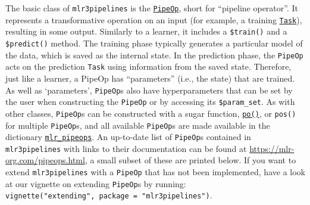 The basic class of \texttt{mlr3pipelines} is the
\href{https://mlr3pipelines.mlr-org.com/reference/PipeOp.html}{\texttt{PipeOp}},
short for ``pipeline operator''. It represents a transformative
operation on an input (for example, a training
\href{https://mlr3.mlr-org.com/reference/Task.html}{\texttt{Task}}),
resulting in some output. Similarly to a learner, it includes a
\texttt{\$train()} and a \texttt{\$predict()} method. The training phase
typically generates a particular model of the data, which is saved as
the internal
state.
In the prediction phase, the \texttt{PipeOp} acts on the prediction
\texttt{Task} using information from the saved state. Therefore, just
like a learner, a PipeOp has ``parameters'' (i.e., the state) that are
trained. As well as `parameters', \texttt{PipeOp}s also have
hyperparameters that can be set by the user when
constructing the \texttt{PipeOp} or by accessing its
\texttt{\$param\_set}. As with other classes, \texttt{PipeOp}s can be
constructed with a sugar function,
\href{https://mlr3pipelines.mlr-org.com/reference/po.html}{\texttt{po()}},
or \texttt{pos()} for multiple \texttt{PipeOp}s, and all available
\texttt{PipeOp}s are made available in the dictionary
\href{https://mlr3pipelines.mlr-org.com/reference/mlr_pipeops.html}{\texttt{mlr\_pipeops}}.
An up-to-date list of \texttt{PipeOp}s contained in
\texttt{mlr3pipelines} with links to their documentation can be found at
\url{https://mlr-org.com/pipeops.html}, a small subset of these are
printed below. If you want to extend \texttt{mlr3pipelines} with a
\texttt{PipeOp} that has not been implemented, have a look at our
vignette on extending \texttt{PipeOp}s by running:
\texttt{vignette("extending",\ package\ =\ "mlr3pipelines")}.

\begin{Shaded}
\begin{Highlighting}[]
\NormalTok{(}\NormalTok{())[}\SpecialCharTok{:}\NormalTok{, }\SpecialCharTok{:}\NormalTok{]}
\end{Highlighting}
\end{Shaded}

